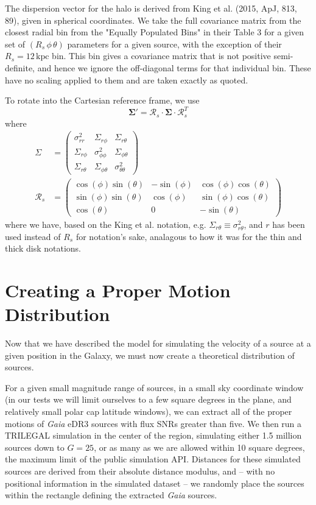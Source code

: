 \documentclass[fleqn,usenatbib]{mnras}
\begin{document}
The dispersion vector for the halo is derived from King et al. (2015, ApJ, 813, 89), given in spherical coordinates.
We take the full covariance matrix from the closest radial bin from the "Equally Populated Bins" in their Table 3 for a given set of $\left(R_s\,\phi\,\theta\right)$ parameters for a given source, with the exception of their $R_s = 12\,\mathrm{kpc}$ bin.
This bin gives a covariance matrix that is not positive semi-definite, and hence we ignore the off-diagonal terms for that individual bin.
These have no scaling applied to them and are taken exactly as quoted.

To rotate into the Cartesian reference frame, we use
\begin{equation}
    \bm{\Sigma}{'} = \bm{\mathcal{R}}_s \cdot \bm{\Sigma} \cdot \bm{\mathcal{R}}_s^T
\end{equation}
where
\begin{align}
    \Sigma &= \left(\begin{matrix} \sigma_{rr}^2 & \Sigma_{r\phi} & \Sigma_{r\theta} \\ \Sigma_{r\phi} & \sigma_{\phi\phi}^2 & \Sigma_{\phi\theta} \\ \Sigma_{r\theta} & \Sigma_{\phi\theta} & \sigma_{\theta\theta}^2 \end{matrix}\right) \\
    \bm{\mathcal{R}}_s &= \left(\begin{matrix} \cos(\phi)\sin(\theta) & -\sin(\phi) & \cos(\phi)\cos(\theta) \\ \sin(\phi)\sin(\theta) & \cos(\phi) & \sin(\phi)\cos(\theta) \\ \cos(\theta) & 0 & -\sin(\theta) \end{matrix}\right)
\end{align}
where we have, based on the King et al. notation, e.g. $\Sigma_{r\theta} \equiv \sigma_{r\theta}^2$, and $r$ has been used instead of $R_s$ for notation's sake, analagous to how it was for the thin and thick disk notations.

\section{Creating a Proper Motion Distribution}
Now that we have described the model for simulating the velocity of a source at a given position in the Galaxy, we must now create a theoretical distribution of sources.

For a given small magnitude range of sources, in a small sky coordinate window (in our tests we will limit ourselves to a few square degrees in the plane, and relatively small polar cap latitude windows), we can extract all of the proper motions of \textit{Gaia} eDR3 sources with flux SNRs greater than five.
We then run a TRILEGAL simulation in the center of the region, simulating either 1.5 million sources down to $G = 25$, or as many as we are allowed within 10 square degrees, the maximum limit of the public simulation API.
Distances for these simulated sources are derived from their absolute distance modulus, and -- with no positional information in the simulated dataset -- we randomly place the sources within the rectangle defining the extracted \textit{Gaia} sources.
\end{document}
